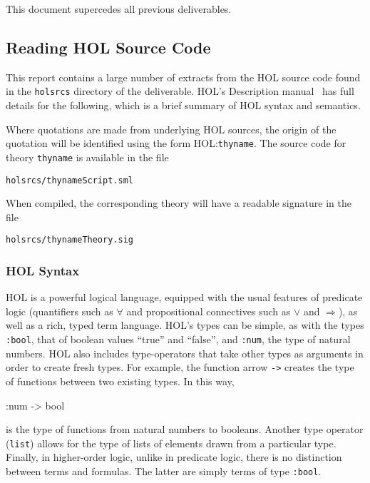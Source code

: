 \documentclass[11pt]{article}
\newcommand{\HOLfile}[1]{HOL:\texttt{#1}}
\begin{document}
\vspace{1ex}
\noindent This document supercedes all previous deliverables.

\subsection{Reading  HOL Source Code}
\label{sec:reading-HOL}

This report contains a large number of extracts from the HOL source
code found in the \texttt{holsrcs} directory of the deliverable.
HOL's Description manual~\cite{HOLdescription} has full details for
the following, which is a brief summary of HOL syntax and semantics.

Where quotations are made from underlying HOL sources, the origin of
the quotation will be identified using the form \HOLfile{thyname}.
The source code for theory \texttt{thyname} is available in the file
\begin{alltt}
   holsrcs/thynameScript.sml
\end{alltt}
When compiled, the corresponding theory will have a readable
signature in the file
\begin{alltt}
   holsrcs/thynameTheory.sig
\end{alltt}


\subsubsection{HOL Syntax}

HOL is a powerful logical language, equipped with the usual features
of predicate logic (quantifiers such as $\forall$ and propositional
connectives such as $\lor$ and $\Rightarrow$), as well as a rich,
typed term language.  HOL's types can be simple, as with the types
\texttt{:bool}, that of boolean values ``true'' and ``false'', and
\texttt{:num}, the type of natural numbers.  HOL also includes
type-operators that take other types as arguments in order to create
fresh types.  For example, the function arrow \texttt{->} creates the
type of functions between two existing types.  In this way,
\begin{stdrule}
   :num -> bool
\end{stdrule}
is the type of functions from natural numbers to booleans.  Another
type operator (\texttt{list}) allows for the type of lists of elements
drawn from a particular type.  Finally, in higher-order logic, unlike
in predicate logic, there is no distinction between terms and
formulas.  The latter are simply terms of type \texttt{:bool}.
\end{document}
